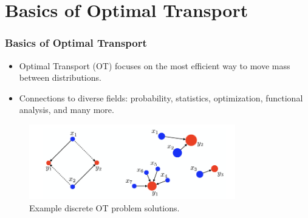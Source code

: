 \documentclass{beamer}
\begin{document}
	\section{Basics of Optimal Transport}
	\begin{frame}
		\frametitle{Basics of Optimal Transport}
		\begin{itemize}
			\item Optimal Transport (OT) focuses on the most efficient way to move mass between distributions.
			\item Connections to diverse fields: probability, statistics, optimization, functional analysis, and many more.
		\end{itemize}
		\begin{figure}
			\includegraphics[width=0.8\textwidth]{basics.png}
			\caption{Example discrete OT problem solutions. \cite{peyre2019computational}}
		\end{figure}
	\end{frame}
	
\end{document}
